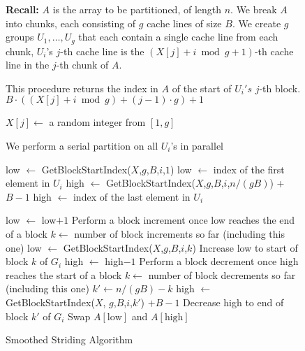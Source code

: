 \documentclass[a4paper,UKenglish,cleveref, autoref, thm-restate]{lipics-v2019}
\begin{document}
\begin{figure*}[h]
  \scriptsize
  \caption{Smoothed Striding Algorithm}
	\label{alg:parallelPartition_smoothedStriding}
	\begin{algorithmic}%
    \State \textbf{Recall:} 
    \State $A$ is the array to be partitioned, of length $n$. 
    \State We break $A$ into chunks, each consisting of $g$ cache lines of size $B$.
    \State We create $g$ groups $U_1,\ldots, U_g$ that each contain a single cache line from each chunk,
    \State $U_i$'s $j$-th cache line is the $(X[j]+i \bmod g + 1)$-th cache line in the $j$-th chunk of $A$.
    \State

      \Comment This procedure returns the index in $A$ of the start of $U_i's$ $j$-th block.
      \State\Return $B\cdot ((X[j] + i \bmod g) +(j-1)\cdot g)+1$
    \EndProcedure
    \State

        \State $X[j] \gets$ a random integer from $[1,g]$ 
      \EndFor

       \Comment We perform a serial partition on all $U_i$'s in parallel

        \State low $\gets$ GetBlockStartIndex($X$,$g$,$B$,$i$,$1$)
        \Comment low $\gets$ index of the first element in $U_i$
        \State high $\gets$ GetBlockStartIndex($X$,$g$,$B$,$i$,$n/(gB)$) + $B-1$
        \Comment high $\gets$ index of the last element in $U_i$

            \State low $\gets$ low$+1$
              \Comment Perform a block increment once low reaches the end of a block
              \State $k \gets $ number of block increments so far (including this one)
              \State low $\gets$ GetBlockStartIndex($X$,$g$,$B$,$i$,$k$)
              \Comment Increase low to start of block $k$ of $G_i$
            \EndIf
          \EndWhile
            \State high $\gets$ high$-1$
              \Comment Perform a block decrement once high reaches the start of a block
              \State $k \gets $ number of block decrements so far (including this one)
              \State $k' \gets n/(gB) - k$
              \State high $\gets$ GetBlockStartIndex($X$, $g$,$B$,$i$,$k'$) $+B-1$
              \Comment Decrease high to end of block $k'$ of $G_i$
            \EndIf
          \EndWhile
          \State Swap $A[\text{low}]$ and $A[\text{high}]$
        \EndWhile
      \EndFor
    \EndProcedure
    \State


\end{algorithmic}
\end{figure*}
\end{document}
